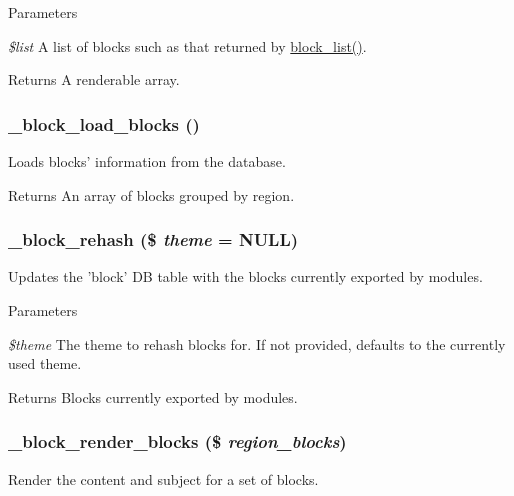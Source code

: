 \begin{DoxyParams}{Parameters}
\item[{\em \$list}]A list of blocks such as that returned by \hyperlink{block_8module_a38999f916243ed473763738bddea9a6b}{block\_\-list()}.\end{DoxyParams}
\begin{DoxyReturn}{Returns}
A renderable array. 
\end{DoxyReturn}
\hypertarget{block_8module_aade0870d32f13ad930bffc6630945029}{
\subsubsection[{\_\-block\_\-load\_\-blocks}]{\setlength{\rightskip}{0pt plus 5cm}\_\-block\_\-load\_\-blocks ()}}
\label{block_8module_aade0870d32f13ad930bffc6630945029}
Loads blocks' information from the database.

\begin{DoxyReturn}{Returns}
An array of blocks grouped by region. 
\end{DoxyReturn}
\hypertarget{block_8module_aa42865f9782787a854c27877cb850dbc}{
\subsubsection[{\_\-block\_\-rehash}]{\setlength{\rightskip}{0pt plus 5cm}\_\-block\_\-rehash (\$ {\em theme} = {\ttfamily NULL})}}
\label{block_8module_aa42865f9782787a854c27877cb850dbc}
Updates the 'block' DB table with the blocks currently exported by modules.


\begin{DoxyParams}{Parameters}
\item[{\em \$theme}]The theme to rehash blocks for. If not provided, defaults to the currently used theme.\end{DoxyParams}
\begin{DoxyReturn}{Returns}
Blocks currently exported by modules. 
\end{DoxyReturn}
\hypertarget{block_8module_ab438e3719fd799bebc21e18678b42d91}{
\subsubsection[{\_\-block\_\-render\_\-blocks}]{\setlength{\rightskip}{0pt plus 5cm}\_\-block\_\-render\_\-blocks (\$ {\em region\_\-blocks})}}
\label{block_8module_ab438e3719fd799bebc21e18678b42d91}
Render the content and subject for a set of blocks.


